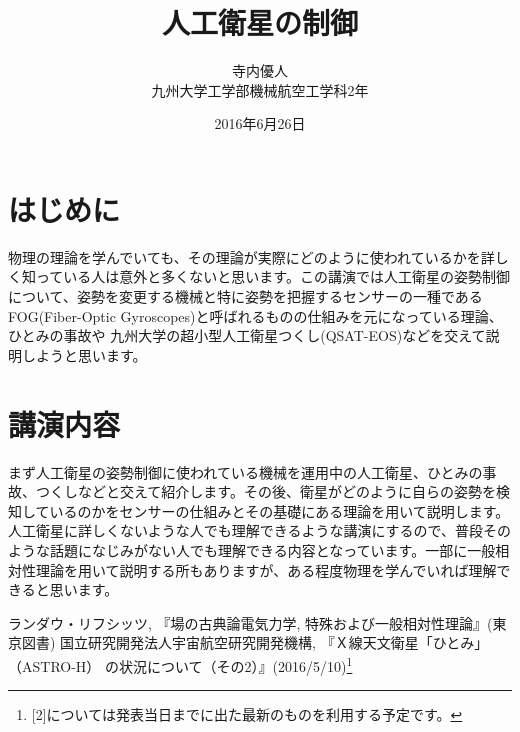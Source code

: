 \documentclass[12pt]{jsarticle}
\title{人工衛星の制御}%
\author{寺内優人\\%
{\small
九州大学工学部機械航空工学科2年　%
}}
\date{2016年6月26日}%
\begin{document}
\maketitle
\thispagestyle{fancy}
\section{はじめに}
物理の理論を学んでいても、その理論が実際にどのように使われているかを詳しく知っている人は意外と多くないと思います。この講演では人工衛星の姿勢制御について、姿勢を変更する機械と特に姿勢を把握するセンサーの一種であるFOG(Fiber-Optic Gyroscopes)と呼ばれるものの仕組みを元になっている理論、ひとみの事故や
九州大学の超小型人工衛星つくし(QSAT-EOS)などを交えて説明しようと思います。 
\section{講演内容}
まず人工衛星の姿勢制御に使われている機械を運用中の人工衛星、ひとみの事故、つくしなどと交えて紹介します。その後、衛星がどのように自らの姿勢を検知しているのかをセンサーの仕組みとその基礎にある理論を用いて説明します。人工衛星に詳しくないような人でも理解できるような講演にするので、普段そのような話題になじみがない人でも理解できる内容となっています。一部に一般相対性理論を用いて説明する所もありますが、ある程度物理を学んでいれば理解できると思います。
\begin{thebibliography}{9}%
\bibitem{}ランダウ・リフシッツ, 『場の古典論電気力学, 特殊および一般相対性理論』(東京図書)
\bibitem{}国立研究開発法人宇宙航空研究開発機構, 『Ｘ線天文衛星「ひとみ」（ASTRO-H） の状況について（その2）』(2016/5/10)\footnote{[2]については発表当日までに出た最新のものを利用する予定です。}
\end{thebibliography}
\end{document}
